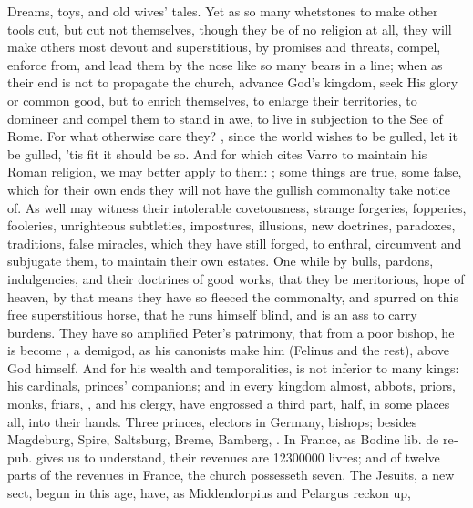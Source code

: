 {Dreams, toys, and old wives' tales. Yet as so many whetstones to
make other tools cut, but cut not themselves, though they be of no
religion at all, they will make others most devout and superstitious,
by promises and threats, compel, enforce from, and lead them by the
nose like so many bears in a line; when as their end is not to
propagate the church, advance God's kingdom, seek His glory or common
good, but to enrich themselves, to enlarge their territories, to
domineer and compel them to stand in awe, to live in subjection to the
See of Rome. For what otherwise care they? , since the world wishes to be gulled, let it be gulled, 'tis
fit it should be so. And for which \Austin{} cites Varro to maintain
his Roman religion, we may better apply to them: ; some things are true, some false, which for
their own ends they will not have the gullish commonalty take notice
of. As well may witness their intolerable covetousness, strange
forgeries, fopperies, fooleries, unrighteous subtleties, impostures,
illusions, new doctrines, paradoxes, traditions, false miracles, which
they have still forged, to enthral, circumvent and subjugate them, to
maintain their own estates. One while by bulls, pardons,
indulgencies, and their doctrines of good works, that they be
meritorious, hope of heaven, by that means they have so fleeced the
commonalty, and spurred on this free superstitious horse, that he runs
himself blind, and is an ass to carry burdens. They have so amplified
Peter's patrimony, that from a poor bishop, he is become , a demigod, as his canonists make him (Felinus and
the rest), above God himself. And for his wealth and 
temporalities, is not inferior to many kings: his cardinals,
princes' companions; and in every kingdom almost, abbots, priors,
monks, friars, \etc{}, and his clergy, have engrossed a third part,
half, in some places all, into their hands. Three princes, electors in
Germany, bishops; besides Magdeburg, Spire, Saltsburg, Breme, Bamberg,
\etc{}. In France, as Bodine \textlatin{lib. de repub.} gives us to understand, their
revenues are 12\thinspace{}300\thinspace{}000 livres; and of twelve parts of the revenues in
France, the church possesseth seven. The Jesuits, a new sect, begun in
this age, have, as Middendorpius and Pelargus reckon up,
}

